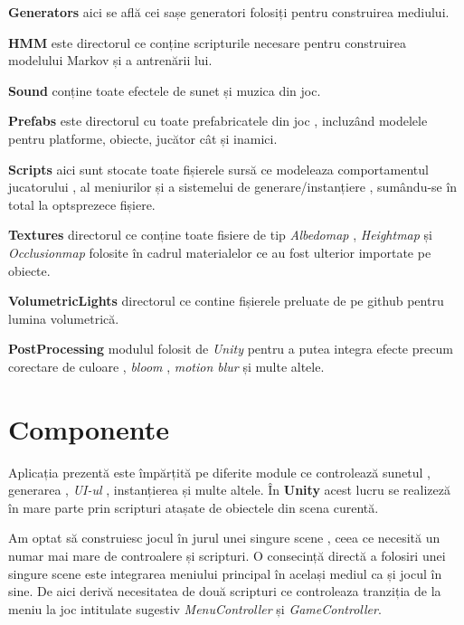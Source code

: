 \textbf{Generators} aici se află cei sașe generatori folosiți pentru construirea mediului.\par

\textbf{HMM} este directorul ce conține scripturile necesare pentru construirea modelului Markov și a antrenării lui.\par

\textbf{Sound} conține toate efectele de sunet și muzica din joc.\par

\textbf{Prefabs} este directorul cu toate prefabricatele din joc , incluzând modelele pentru platforme, obiecte, jucător cât și inamici.

\textbf{Scripts} aici sunt stocate toate fișierele sursă ce modeleaza comportamentul jucatorului , al meniurilor și a sistemelui de generare/instanțiere , sumându-se în total la optsprezece fișiere.\par

\textbf{Textures} directorul ce conține toate fisiere de tip \textit{Albedomap} , \textit{Heightmap} și \textit{Occlusionmap} folosite în cadrul materialelor ce au fost ulterior importate pe obiecte.\par

\textbf{VolumetricLights} directorul ce contine fișierele preluate de pe github pentru lumina volumetrică.\par

\textbf{PostProcessing} modulul folosit de \textit{Unity} pentru a putea integra efecte precum corectare de culoare , \textit{bloom} , \textit{motion blur} și multe altele.\par


\section{Componente}
Aplicația prezentă este împărțită pe diferite module ce controlează sunetul , generarea , \textit{UI-ul} , instanțierea și multe altele. În \textbf{Unity} acest lucru se realizeză în mare parte prin scripturi atașate de obiectele din scena curentă. \par
Am optat să construiesc jocul în jurul unei singure scene , ceea ce necesită un numar mai mare de controalere și scripturi. O consecință directă a folosiri unei singure scene este integrarea meniului principal în același mediul ca și jocul în sine. De aici derivă necesitatea de două scripturi ce controleaza tranziția de la meniu la joc intitulate sugestiv \textit{MenuController} și \textit{GameController}.\par

